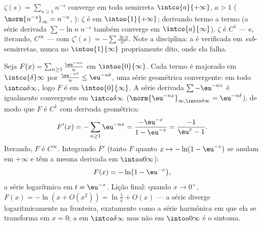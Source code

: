 \begin{example}\label{ex:b2:funcseq:zeta}
$\zeta(s) = \sum_{n\geq1} n^{-s}$ converge  em toda
semirreta $\intco{a}{+\infty}$, $a > 1$ ($\norm{n^{-s}}_\infty =
n^{-a}$, ): $\zeta$ é  em $\intoo{1}{+\infty}$;
derivando termo a termo (a série derivada $\sum -\ln n\; n^{-s}$
também converge  em $\intco{a}{\infty}$), $\zeta$ é $C^1$
--- e, iterando, $C^\infty$ --- com $\zeta'(s) = -\sum \frac{\ln
n}{n^s}$. Note a disciplina: a  é verificada em
\emph{sub}-semirretas, nunca no  $\intoo{1}{\infty}$
propriamente dito, onde ela falha.
\end{example}

\begin{example}\label{ex:b2:funcseq:logseries}
Seja $F(x) = \sum_{n\geq1} \frac{\eu^{-nx}}{n}$ em
$\intoo{0}{\infty}$. Cada termo é majorado em $\intco{\delta}
\infty$ por $\frac{\eu^{-n\delta}}{n} \leq \eu^{-n\delta}$, uma
série geométrica convergente:  em todo
$\intco\delta\infty$, logo $F$ é  em
$\intoo{0}{\infty}$. A série derivada $\sum -\eu^{-nx}$ é
igualmente  convergente em $\intco\delta\infty$
($\norm{\eu^{-nx}}_{\infty,\intco\delta\infty} =
\eu^{-n\delta}$), de modo que $F$ é $C^1$ com derivada geométrica:
\[
F'(x) = -\sum_{n\geq1}\eu^{-nx}
= \frac{-\eu^{-x}}{1 - \eu^{-x}}
= \frac{-1}{\eu^{x} - 1} .
\]
Iterando, $F$ é $C^\infty$. Integrando $F'$ (tanto $F$ quanto $x
\mapsto -\ln(1 - \eu^{-x})$ se anulam em $+\infty$ e têm a
mesma derivada em $\intoo0\infty$):
\[
F(x) = -\ln\bigl(1 - \eu^{-x}\bigr),
\]
a série logarítmica em $t = \eu^{-x}$. Lição final: quando $x
\to 0^+$, $F(x) = -\ln(x + O(x^2)) = \ln\frac1x + O(x)$ --- a
série diverge logaritmicamente na fronteira, exatamente como a
série harmônica em que ela se transforma em $x = 0$; a  em
$\intco\delta\infty$ mas não em $\intoo0\infty$ é o
sintoma.
\end{example}

